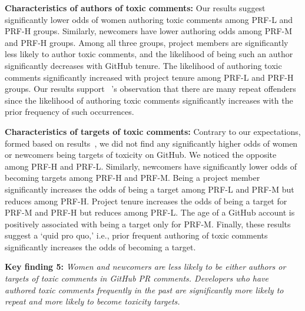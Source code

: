 \vspace{10pt}

\noindent \textbf{Characteristics of authors of toxic comments:}
Our results suggest significantly lower odds of women authoring toxic comments among PRF-L and PRF-H groups. Similarly, newcomers have lower authoring odds among PRF-M and PRF-H groups.
Among all three groups, project members are significantly less likely to author toxic comments, and the likelihood of being such an author significantly decreases with GitHub tenure.
The likelihood of authoring toxic comments significantly increased with project tenure among PRF-L and PRF-H groups. 
Our results support ~\citet{miller2022did}'s observation that there are many repeat offenders since the likelihood of authoring toxic comments significantly increases with the prior frequency of such occurrences.





\vspace{4pt}
\noindent \textbf{Characteristics of targets of toxic comments:}
Contrary to our expectations, formed based on results~\cite{gunawardena2022destructive,raman2020stress,steinmacher2015social}, we did not find any significantly higher odds of women or newcomers being targets of toxicity on GitHub. We noticed the opposite among PRF-H and PRF-L. Similarly, newcomers have significantly lower odds of becoming targets among PRF-H and PRF-M.
Being a project member significantly increases the odds of being a target among PRF-L and PRF-M but reduces among PRF-H.
Project tenure increases the odds of being a target for PRF-M and PRF-H but reduces among PRF-L.
The age of a GitHub account is positively associated with being a target only for PRF-M. 
Finally, these results suggest a `quid pro quo,' i.e., prior frequent authoring of toxic comments significantly increases the odds of becoming a target. 


 

\begin{boxedtext}
\textbf{Key finding  5:} \emph{Women and newcomers are less likely to be either authors or targets of toxic comments in GitHub PR comments. Developers who have authored toxic comments frequently in the past are significantly more likely to repeat and more likely to become toxicity targets. }
\end{boxedtext}

